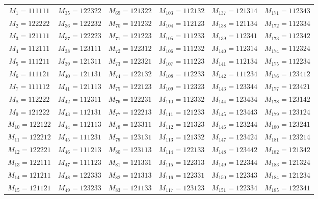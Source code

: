 \documentclass{svmult}
\begin{document}
\begin{center}
\begin{tabular}{cccccc} \hline
  $M_{1} = 111111$ &  $M_{35} = 122322$ &  $M_{69} = 121322$ & $M_{103} = 112132$ & $M_{137} = 121314$ & $M_{171} = 112343$ \\
  $M_{2} = 122222$ &  $M_{36} = 122232$ &  $M_{70} = 121232$ & $M_{104} = 112123$ & $M_{138} = 121134$ & $M_{172} = 112334$ \\
  $M_{3} = 121111$ &  $M_{37} = 122223$ &  $M_{71} = 121223$ & $M_{105} = 111233$ & $M_{139} = 112341$ & $M_{173} = 112342$ \\
  $M_{4} = 112111$ &  $M_{38} = 123111$ &  $M_{72} = 122312$ & $M_{106} = 111232$ & $M_{140} = 112314$ & $M_{174} = 112324$ \\
  $M_{5} = 111211$ &  $M_{39} = 121311$ &  $M_{73} = 122321$ & $M_{107} = 111223$ & $M_{141} = 112134$ & $M_{175} = 112234$ \\
  $M_{6} = 111121$ &  $M_{40} = 121131$ &  $M_{74} = 122132$ & $M_{108} = 112233$ & $M_{142} = 111234$ & $M_{176} = 123412$ \\
  $M_{7} = 111112$ &  $M_{41} = 121113$ &  $M_{75} = 122123$ & $M_{109} = 112323$ & $M_{143} = 123344$ & $M_{177} = 123421$ \\
  $M_{8} = 112222$ &  $M_{42} = 112311$ &  $M_{76} = 122231$ & $M_{110} = 112332$ & $M_{144} = 123434$ & $M_{178} = 123142$ \\
  $M_{9} = 121222$ &  $M_{43} = 112131$ &  $M_{77} = 122213$ & $M_{111} = 121233$ & $M_{145} = 123443$ & $M_{179} = 123124$ \\
 $M_{10} = 122122$ &  $M_{44} = 112113$ &  $M_{78} = 123311$ & $M_{112} = 121323$ & $M_{146} = 123244$ & $M_{180} = 123241$ \\
 $M_{11} = 122212$ &  $M_{45} = 111231$ &  $M_{79} = 123131$ & $M_{113} = 121332$ & $M_{147} = 123424$ & $M_{181} = 123214$ \\
 $M_{12} = 122221$ &  $M_{46} = 111213$ &  $M_{80} = 123113$ & $M_{114} = 122133$ & $M_{148} = 123442$ & $M_{182} = 121342$ \\
 $M_{13} = 122111$ &  $M_{47} = 111123$ &  $M_{81} = 121331$ & $M_{115} = 122313$ & $M_{149} = 122344$ & $M_{183} = 121324$ \\
 $M_{14} = 121211$ &  $M_{48} = 122333$ &  $M_{82} = 121313$ & $M_{116} = 122331$ & $M_{150} = 122343$ & $M_{184} = 121234$ \\
 $M_{15} = 121121$ &  $M_{49} = 123233$ &  $M_{83} = 121133$ & $M_{117} = 123123$ & $M_{151} = 122334$ & $M_{185} = 122341$ \\

\end{tabular}
\end{center}
\end{document}

